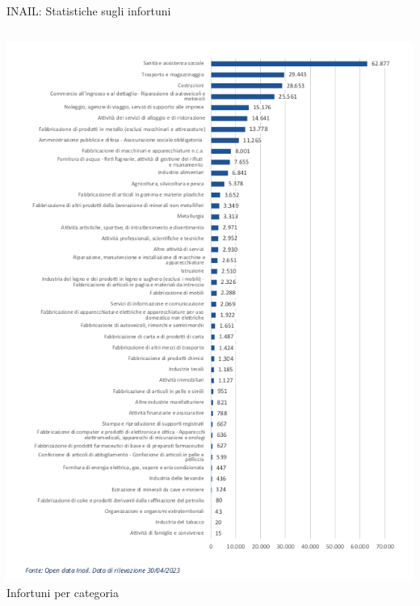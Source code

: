 \documentclass{beamer}
\begin{document}
\begin{frame}{INAIL: Statistiche sugli infortuni}
\begin{columns}
    \begin{column}{0.3\textwidth}
      \centering
      \includegraphics[width=\textwidth]{images/infortuni_industria_e_servizi.png}
      \vspace{2mm}
      \small{Infortuni per categoria}
    \end{column}
  \end{columns}
\end{frame}
\end{document}
